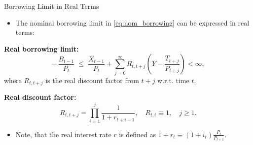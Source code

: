 \documentclass[11pt,aspectratio=169]{beamer}
\begin{document}
\begin{frame}{Borrowing Limit in Real Terms}

\begin{itemize}
    \item The nominal borrowing limit in \eqref{eq:nom_borrowing} can be expressed in real terms:
\end{itemize}

\vspace{0.25cm}
\noindent\textbf{Real borrowing limit:}
\begin{equation}
  -\,\frac{B_{t-1}}{P_t} \;\le\; \frac{X_{t-1}}{P_t} 
  + \sum_{j=0}^{\infty} R_{t,t+j} \left( Y - \frac{T_{t+j}}{P_{t+j}} \right) 
  < \infty,
\label{eq:real_borrowing}
\end{equation}
\hspace{0.65cm} where $R_{t,t+j}$ is the real discount factor from $t+j$ w.r.t. time $t$.

\vspace{0.25cm}
\noindent\textbf{Real discount factor:}
\begin{equation}
R_{t,t+j} = \prod_{i=1}^{j} \frac{1}{1 + r_{t+i-1}}, 
\quad R_{t,t} \equiv 1, 
\quad j \ge 1.
\label{eq:real_discount_fac}
\end{equation}

\begin{itemize} \item Note, that the real interest rate $r$ is defined as $1+r_t \equiv (1+i_t)\frac{P_t}{P_{t+1}}$. \end{itemize}

\end{frame}
\end{document}
